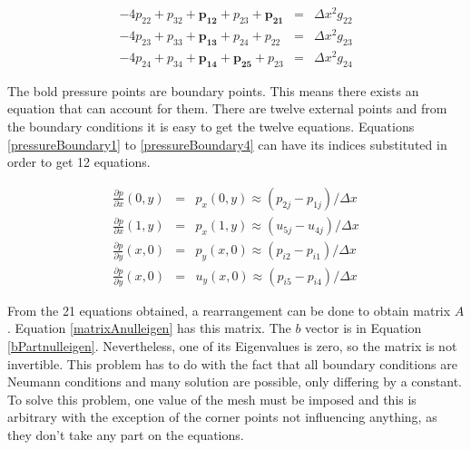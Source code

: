 \documentclass[journal]{IEEEtran}
\begin{document}
\begin{eqnarray}
-4p_{22} + p_{32} + \boldsymbol{p_{12}} + p_{23} + \boldsymbol{p_{21}} &=& \Delta x^2 g_{22} \label{internalPoissonEq1}\\
-4p_{23} + p_{33} + \boldsymbol{p_{13}} + p_{24} + p_{22} &=& \Delta x^2 g_{23}\label{internalPoissonEq2}\\
-4p_{24} + p_{34} + \boldsymbol{p_{14}} + \boldsymbol{p_{25}} + p_{23} &=& \Delta x^2 g_{24}\label{internalPoissonEq3}
\end{eqnarray}

The bold pressure points are boundary points. This means there exists an equation that can account for them. There are twelve external points and from the boundary conditions it is easy to get the twelve equations. Equations \ref{pressureBoundary1} to \ref{pressureBoundary4} can have its indices substituted in order to get 12 equations.

\begin{eqnarray}
\frac{\partial p}{\partial x}\left(0, y\right) &=& p_x\left(0, y\right)  \approx  (p_{2j} - p_{1j})/\Delta x \label{pressureBoundary1}\\
\frac{\partial p}{\partial x}\left(1, y\right) &=& p_x\left(1, y\right)  \approx  (u_{5j} - u_{4j})/\Delta x\\
\frac{\partial p}{\partial y}\left(x, 0\right) &=& p_y\left(x, 0\right)  \approx (p_{i2} - p_{i1})/\Delta x\\
\frac{\partial p}{\partial y}\left(x, 0\right) &=& u_y\left(x, 0\right)  \approx  (p_{i5} - p_{i4})/\Delta x\label{pressureBoundary4}
\end{eqnarray}

From the 21 equations obtained, a rearrangement can be done to obtain matrix $A$. Equation \ref{matrixAnulleigen} has this matrix. The $b$ vector is in Equation \ref{bPartnulleigen}. Nevertheless, one of its Eigenvalues is zero, so the matrix is not invertible. This problem has to do with the fact that all boundary conditions are Neumann conditions and many solution are possible, only differing by a constant. To solve this problem, one value of the mesh must be imposed and this is arbitrary with the exception of the corner points not influencing anything, as they don't take any part on the equations. 
\end{document}
